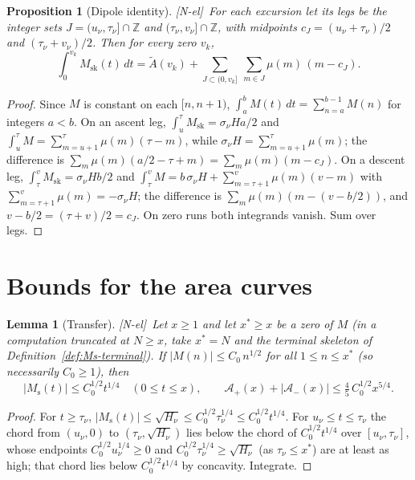 \documentclass[11pt,reqno]{amsart}
\numberwithin{equation}{section}
\theoremstyle{plain}
\newtheorem{proposition}[theorem]{Proposition}
\newtheorem{lemma}[theorem]{Lemma}
\theoremstyle{definition}
\theoremstyle{remark}
\newcommand{\Ms}{M_{\mathrm{s}}}
\newcommand{\Msk}{M_{\mathrm{sk}}}
\newcommand{\Ap}{\mathcal{A}_{+}}
\newcommand{\Am}{\mathcal{A}_{-}}
\newcommand{\tagNE}{\textup{[N-el]}}
\begin{document}
\begin{proposition}[Dipole identity]
\label{prop:dipoles}
\tagNE\ For each excursion let its \emph{legs} be the integer sets
$J=(u_\nu,\tau_\nu]\cap\mathbb{Z}$ and
$(\tau_\nu,v_\nu]\cap\mathbb{Z}$, with midpoints $c_J=(u_\nu+\tau_\nu)/2$
and $(\tau_\nu+v_\nu)/2$. Then for every zero $v_k$,
\begin{equation}
\label{eq:dipoles}
  \int_0^{v_k}\Msk(t)\,dt=\widetilde{A}(v_k)
  +\sum_{J\subset(0,v_k]}\ \sum_{m\in J}\mu(m)\,(m-c_J).
\end{equation}
\end{proposition}

\begin{proof}
Since $M$ is constant on each $[n,n+1)$, $\int_a^bM(t)\,dt=\sum_{n=a}^{b-1}M(n)$
for integers $a<b$. On an ascent leg, $\int_{u}^{\tau}\Msk=\sigma_\nu H a/2$ and
$\int_u^\tau M=\sum_{m=u+1}^{\tau}\mu(m)(\tau-m)$, while
$\sigma_\nu H=\sum_{m=u+1}^{\tau}\mu(m)$; the difference is
$\sum_m\mu(m)(a/2-\tau+m)=\sum_m\mu(m)(m-c_J)$. On a descent leg,
$\int_\tau^v\Msk=\sigma_\nu Hb/2$ and
$\int_\tau^vM=b\,\sigma_\nu H+\sum_{m=\tau+1}^{v}\mu(m)(v-m)$ with
$\sum_{m=\tau+1}^{v}\mu(m)=-\sigma_\nu H$; the difference is
$\sum_m\mu(m)(m-(v-b/2))$, and $v-b/2=(\tau+v)/2=c_J$. On zero runs
both integrands vanish. Sum over legs.
\end{proof}


\section{Bounds for the area curves}
\label{sec:bounds}

\begin{lemma}[Transfer]
\label{lem:transfer}
\tagNE\ Let $x\ge1$ and let $x^*\ge x$ be a zero of $M$ (in a computation truncated
at $N\ge x$, take $x^*=N$ and the terminal skeleton of
Definition~\ref{def:Ms-terminal}). If $|M(n)|\le C_0\,n^{1/2}$ for all
$1\le n\le x^*$ (so necessarily $C_0\ge1$), then
\begin{equation}
\label{eq:transfer_bound}
  |\Ms(t)|\le C_0^{1/2}t^{1/4}\quad(0\le t\le x),\qquad
  \Ap(x)+|\Am(x)|\le\tfrac45\,C_0^{1/2}x^{5/4}.
\end{equation}
\end{lemma}

\begin{proof}
For $t\ge\tau_\nu$, $|\Ms(t)|\le\sqrt{H_\nu}\le C_0^{1/2}\tau_\nu^{1/4}\le
C_0^{1/2}t^{1/4}$. For $u_\nu\le t\le\tau_\nu$ the chord from $(u_\nu,0)$ to
$(\tau_\nu,\sqrt{H_\nu})$ lies below the chord of $C_0^{1/2}t^{1/4}$ over
$[u_\nu,\tau_\nu]$, whose endpoints $C_0^{1/2}u_\nu^{1/4}\ge0$ and
$C_0^{1/2}\tau_\nu^{1/4}\ge\sqrt{H_\nu}$ (as $\tau_\nu\le x^*$) are at
least as high; that chord lies below $C_0^{1/2}t^{1/4}$ by concavity.
Integrate.
\end{proof}
\end{document}
